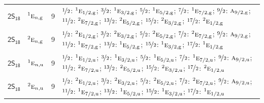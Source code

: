 \documentclass[10pt,a4paper]{article}
\numberwithin{equation}{section}
\newcommand{\grp}[1]{\mathsf{#1}}
\newcommand{\irr}[1]{\text{\normalfont\scshape #1}}
\newcommand{\conjpair}[1]{{}^{#1}}
\newcommand{\ptag}[1]{\mathrm{#1}}
\newlength{\fillwidth}\newlength{\cellwidth}\newlength{\colwidth}
\begin{document}
{\begin{longtable}{@{}llr>{\RaggedRight\arraybackslash}p{\fillwidth}@{}}
\href{2S18.pdf}{$\grp{2S_{18}}$} & $\conjpair{1}\irr{e}_{n,\ptag{g}}$ & 9 & $\nicefrac{1}{2}$: $\conjpair{1}\irr{e}_{1/2,\ptag{g}}$; $\nicefrac{3}{2}$: $\conjpair{1}\irr{e}_{3/2,\ptag{g}}$; $\nicefrac{5}{2}$: $\conjpair{1}\irr{e}_{5/2,\ptag{g}}$; $\nicefrac{7}{2}$: $\conjpair{1}\irr{e}_{7/2,\ptag{g}}$; $\nicefrac{9}{2}$: $\irr{a}_{9/2,\ptag{g}}$; $\nicefrac{11}{2}$: $\conjpair{2}\irr{e}_{7/2,\ptag{g}}$; $\nicefrac{13}{2}$: $\conjpair{2}\irr{e}_{5/2,\ptag{g}}$; $\nicefrac{15}{2}$: $\conjpair{2}\irr{e}_{3/2,\ptag{g}}$; $\nicefrac{17}{2}$: $\conjpair{2}\irr{e}_{1/2,\ptag{g}}$\\
\href{2S18.pdf}{$\grp{2S_{18}}$} & $\conjpair{2}\irr{e}_{n,\ptag{g}}$ & 9 & $\nicefrac{1}{2}$: $\conjpair{2}\irr{e}_{1/2,\ptag{g}}$; $\nicefrac{3}{2}$: $\conjpair{2}\irr{e}_{3/2,\ptag{g}}$; $\nicefrac{5}{2}$: $\conjpair{2}\irr{e}_{5/2,\ptag{g}}$; $\nicefrac{7}{2}$: $\conjpair{2}\irr{e}_{7/2,\ptag{g}}$; $\nicefrac{9}{2}$: $\irr{a}_{9/2,\ptag{g}}$; $\nicefrac{11}{2}$: $\conjpair{1}\irr{e}_{7/2,\ptag{g}}$; $\nicefrac{13}{2}$: $\conjpair{1}\irr{e}_{5/2,\ptag{g}}$; $\nicefrac{15}{2}$: $\conjpair{1}\irr{e}_{3/2,\ptag{g}}$; $\nicefrac{17}{2}$: $\conjpair{1}\irr{e}_{1/2,\ptag{g}}$\\
\href{2S18.pdf}{$\grp{2S_{18}}$} & $\conjpair{1}\irr{e}_{n,\ptag{u}}$ & 9 & $\nicefrac{1}{2}$: $\conjpair{1}\irr{e}_{1/2,\ptag{u}}$; $\nicefrac{3}{2}$: $\conjpair{1}\irr{e}_{3/2,\ptag{u}}$; $\nicefrac{5}{2}$: $\conjpair{1}\irr{e}_{5/2,\ptag{u}}$; $\nicefrac{7}{2}$: $\conjpair{1}\irr{e}_{7/2,\ptag{u}}$; $\nicefrac{9}{2}$: $\irr{a}_{9/2,\ptag{u}}$; $\nicefrac{11}{2}$: $\conjpair{2}\irr{e}_{7/2,\ptag{u}}$; $\nicefrac{13}{2}$: $\conjpair{2}\irr{e}_{5/2,\ptag{u}}$; $\nicefrac{15}{2}$: $\conjpair{2}\irr{e}_{3/2,\ptag{u}}$; $\nicefrac{17}{2}$: $\conjpair{2}\irr{e}_{1/2,\ptag{u}}$\\
\href{2S18.pdf}{$\grp{2S_{18}}$} & $\conjpair{2}\irr{e}_{n,\ptag{u}}$ & 9 & $\nicefrac{1}{2}$: $\conjpair{2}\irr{e}_{1/2,\ptag{u}}$; $\nicefrac{3}{2}$: $\conjpair{2}\irr{e}_{3/2,\ptag{u}}$; $\nicefrac{5}{2}$: $\conjpair{2}\irr{e}_{5/2,\ptag{u}}$; $\nicefrac{7}{2}$: $\conjpair{2}\irr{e}_{7/2,\ptag{u}}$; $\nicefrac{9}{2}$: $\irr{a}_{9/2,\ptag{u}}$; $\nicefrac{11}{2}$: $\conjpair{1}\irr{e}_{7/2,\ptag{u}}$; $\nicefrac{13}{2}$: $\conjpair{1}\irr{e}_{5/2,\ptag{u}}$; $\nicefrac{15}{2}$: $\conjpair{1}\irr{e}_{3/2,\ptag{u}}$; $\nicefrac{17}{2}$: $\conjpair{1}\irr{e}_{1/2,\ptag{u}}$\\

\end{longtable}}
\end{document}
